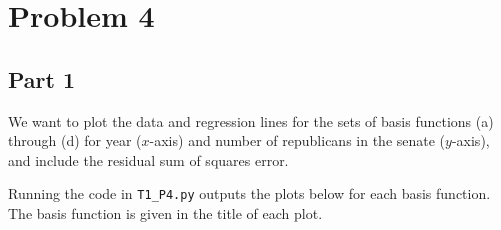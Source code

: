 \documentclass[submit]{harvardml}
\begin{document}
\newpage

\section{Problem 4}

\subsection{Part 1}
We want to plot the data and regression lines for the sets of basis functions (a) through (d) for year ($x$-axis) and number of republicans in the senate ($y$-axis), and include the residual sum of squares error.

Running the code in \verb+T1_P4.py+ outputs the plots below for each basis function. The basis function is given in the title of each plot.
\end{document}
